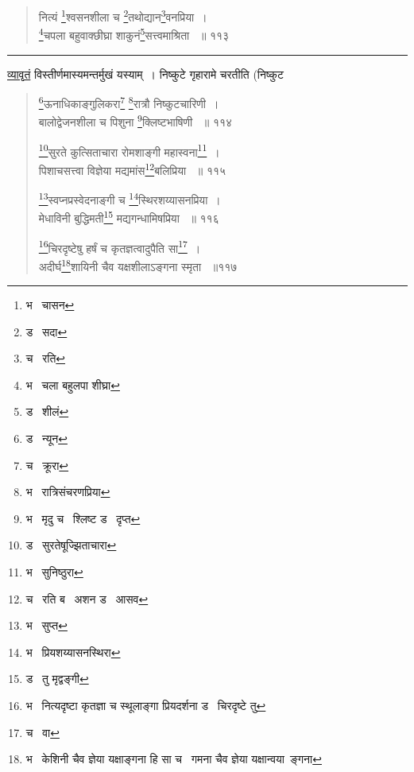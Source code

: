 \documentclass[11pt, openany]{book}
\begin{document}
{\begin{quote}
{नित्यं \renewcommand{\thefootnote}{13}\footnote{भ \textendash\ चासन }श्वसनशीला च \renewcommand{\thefootnote}{14}\footnote{ड \textendash\ सदा }तथोद्यान\renewcommand{\thefootnote}{15}\footnote{च \textendash\ रति }वनप्रिया~।\\ 
\renewcommand{\thefootnote}{16}\footnote{भ \textendash\ चला बहुलपा शीघ्रा}चपला बहुवाक्छीघ्रा शाकुनं\renewcommand{\thefootnote}{17}\footnote{ड \textendash\ शीलं }सत्त्वमाश्रिता ~॥ ११३}
\end{quote}

\hrule

\vspace{2mm}

\noindent
\underline{व्यावृतं} विस्तीर्णमास्यमन्तर्मुखं यस्याम्~। निष्कुटे गृहारामे चरतीति (निष्कुट\textendash\ 

\newpage

\begin{quote}
 {\na \renewcommand{\thefootnote}{1}\footnote{ड \textendash\ न्यून }ऊनाधिकाङ्गुलिकरा\renewcommand{\thefootnote}{2}\footnote{च \textendash\ क्रूरा } \renewcommand{\thefootnote}{3}\footnote{भ \textendash\ रात्रिसंचरणप्रिया}रात्रौ निष्कुटचारिणी~। \\
बालोद्वेजनशीला च पिशुना \renewcommand{\thefootnote}{4}\footnote{भ \textendash\ मृदु च \textendash\ श्लिष्ट ड \textendash\ दृप्त}क्लिष्टभाषिणी ~॥ ११४

\renewcommand{\thefootnote}{5}\footnote{ड \textendash\ सुरतेषूज्झिताचारा }सुरते कुत्सिताचारा रोमशाङ्गी महास्वना\renewcommand{\thefootnote}{6}\footnote{भ \textendash\ सुनिष्ठुरा }~।\\ 
पिशाचसत्त्वा विज्ञेया मद्यमांस\renewcommand{\thefootnote}{7}\footnote{च \textendash\ रति ब \textendash\ अशन ड \textendash\ आसव }बलिप्रिया ~॥ ११५ 

\renewcommand{\thefootnote}{8}\footnote{भ \textendash\ सुप्त}स्वप्नप्रस्वेदनाङ्गी च \renewcommand{\thefootnote}{9}\footnote{भ \textendash\ प्रियशय्यासनस्थिरा}स्थिरशय्यासनप्रिया~। \\
मेधाविनी बुद्धिमती\renewcommand{\thefootnote}{10}\footnote{ड \textendash\ तु मृद्वङ्गी} मद्यगन्धामिषप्रिया ~॥ ११६ 

\renewcommand{\thefootnote}{11}\footnote{भ \textendash\ नित्यदृष्टा कृतज्ञा च स्थूलाङ्गा प्रियदर्शना ड \textendash\ चिरदृष्टे तु}चिरदृष्टेषु हर्षं च कृतज्ञत्वादुपैति सा\renewcommand{\thefootnote}{12}\footnote{च \textendash\ वा }~।\\ 
अदीर्घ\renewcommand{\thefootnote}{13}\footnote{भ \textendash\ केशिनी चैव ज्ञेया यक्षाङ्गना हि सा च \textendash\ गमना चैव ज्ञेया यक्षान्वया\textendash\ ङ्गना}शायिनी चैव यक्षशीलाऽङ्गना स्मृता ~॥११७ 

}
\end{quote}}
\end{document}
